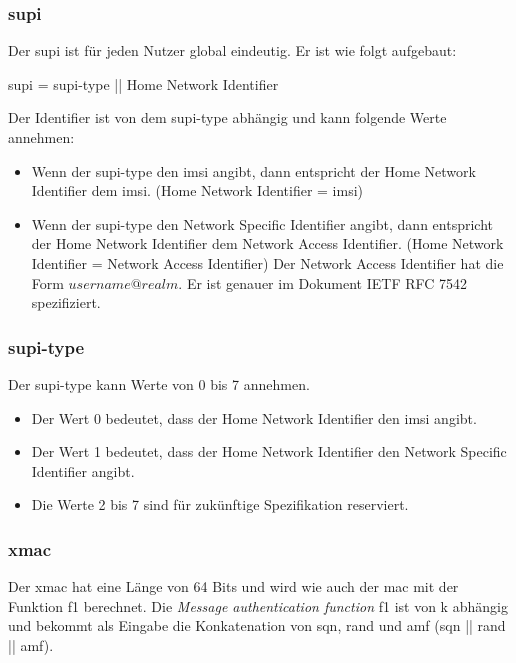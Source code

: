 \subsubsection{\gls{supi}}
Der \gls{supi} ist für jeden Nutzer global eindeutig. 
Er ist wie folgt aufgebaut: %

\gls{supi} = \gls{supi-type} || Home Network Identifier

Der Identifier ist von dem \gls{supi-type} abhängig und kann folgende Werte annehmen:

\begin{itemize}
\item Wenn der \gls{supi-type} den \gls{imsi} angibt, dann entspricht der Home Network Identifier dem \gls{imsi}. (Home Network Identifier = \gls{imsi})
\item Wenn der \gls{supi-type} den Network Specific Identifier angibt, dann entspricht der Home Network Identifier dem Network Access Identifier. (Home Network Identifier = Network Access Identifier)
Der Network Access Identifier hat die Form $ username@realm $. 
Er ist genauer im Dokument IETF RFC 7542 spezifiziert. %
\end{itemize}

\subsubsection{\gls{supi-type}}
Der \gls{supi-type} kann Werte von 0 bis 7 annehmen. %
\begin{itemize}
\item Der Wert 0 bedeutet, dass der Home Network Identifier den \gls{imsi} angibt.
\item Der Wert 1 bedeutet, dass der Home Network Identifier den Network Specific Identifier angibt.
\item Die Werte 2 bis 7 sind für zukünftige Spezifikation reserviert.
\end{itemize}

\subsubsection{\gls{xmac}}
Der \gls{xmac} hat eine Länge von 64 Bits und wird wie auch der \gls{mac} mit der Funktion f1 berechnet. %
Die \textit{Message authentication function} f1 ist von \gls{k} abhängig und bekommt als Eingabe die Konkatenation von \gls{sqn}, \gls{rand} und \gls{amf} (\gls{sqn} || \gls{rand} || \gls{amf}). %

